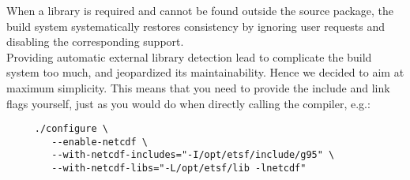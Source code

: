 When a library is required and cannot be found outside the source
package, the build system systematically restores consistency by
ignoring user requests and disabling the corresponding support.
\\

Providing automatic external library detection lead to complicate the
build system too much, and jeopardized its maintainability.
Hence we decided to aim at maximum simplicity.
This means that you need to provide the include and link flags yourself,
just as you would do when directly calling the compiler, e.g.:

{\small
\begin{verbatim}
     ./configure \
        --enable-netcdf \
        --with-netcdf-includes="-I/opt/etsf/include/g95" \
        --with-netcdf-libs="-L/opt/etsf/lib -lnetcdf"
\end{verbatim}
}

